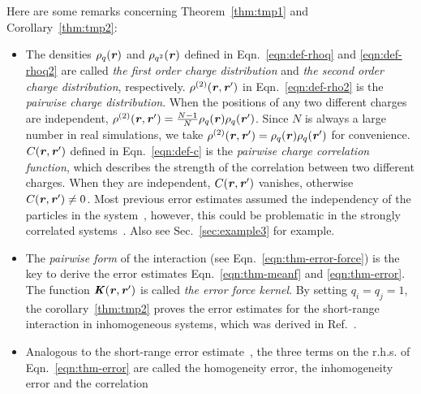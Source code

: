 \documentclass[aps,pre,preprint,unsortedaddress]{revtex4}
\newcommand{\redc}[1]{{\color{red} #1}}
\renewcommand{\v}[1]{\textbf{\textit{#1}}}
\begin{document}
Here are some remarks concerning Theorem~\ref{thm:tmp1} and Corollary~\ref{thm:tmp2}:
\begin{itemize}
\item The densities $\rho_q(\v r)$ and $\rho_{q^2}(\v r)$ defined in
  Eqn.~\eqref{eqn:def-rhoq} and \eqref{eqn:def-rhoq2} are called \emph{the
    first order charge distribution} and \emph{the
    second order charge distribution},
  respectively.
  $\rho^{(2)}(\v r, \v r')$ in Eqn.~\eqref{eqn:def-rho2}
  is the \emph{pairwise charge distribution}.
  When the positions of any two different charges are independent,
  $\rho^{(2)}(\v r, \v r') = \frac{N-1}{N}\rho_q(\v r)\rho_q(\v r')$.
  Since $N$ is always a large number in real simulations, we take
  $\rho^{(2)}(\v r, \v r') = \rho_q(\v r)\rho_q(\v r')$ for convenience.
  $C(\v r, \v r')$ defined in
  Eqn.~\eqref{eqn:def-c} is the \emph{pairwise charge correlation function},
  which describes the strength of the correlation between  two
  different charges. When they are independent, $C(\v r, \v r')$
  vanishes, otherwise $C(\v r, \v r') \neq 0$.
  Most \redc{previous} error estimates assumed the independency of the
  particles in the system~\cite{kolafa1992cutoff, hummer1995numerical, deserno1998mue2, petersen1995accuracy, wang2010optimizing, neelov2010interlaced, ballenegger2012convert, wang2012},
  however, this could be problematic in the strongly correlated
  systems~\cite{deserno1998mue2, wang2010optimizing, ballenegger2012convert}.
  Also see Sec.~\ref{sec:example3} for example.
\item
  The \emph{pairwise form}
  of the interaction (see Eqn.~\eqref{eqn:thm-error-force}) is the key to derive
  the error estimates Eqn.~\eqref{eqn:thm-meanf} and \eqref{eqn:thm-error}.
  The function $\v K(\v r, \v r')$ is called \emph{the error force
    kernel}.
  By setting $q_i = q_j = 1$, the corollary~\ref{thm:tmp2} proves
  the error estimates for the short-range interaction
  in inhomogeneous systems, which was derived in Ref.~\cite{wang2012}. 
\item \redc{Analogous} to the short-range error estimate~\cite{wang2012}, the
  three terms on the r.h.s. of Eqn.~\eqref{eqn:thm-error} are called the
  homogeneity error, the inhomogeneity error and the correlation

\end{itemize}
\end{document}
